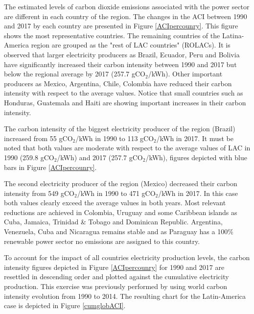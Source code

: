 \documentclass[energies,article,accept,moreauthors,12pt,a4paper]{mdpi} %
\begin{document}
        
          The estimated levels of carbon dioxide emissions associated with the power sector are different in each country of the region. The changes in the ACI between 1990 and 2017 by each country are presented in Figure  \ref{ACIpercounry}.
This figure shows the most representative countries. The remaining countries of the Latina-America region are grouped as the "rest of LAC countries" (ROLACs). It is observed that larger electricity producers as Brazil, Ecuador, Peru and Bolivia have significantly increased their carbon intensity between 1990 and 2017 but below the regional average by 2017 (257.7 gCO$_2$/kWh). Other important producers as Mexico, Argentina, Chile, Colombia have reduced their carbon intensity with respect to the average values. Notice that small countries such as Honduras, Guatemala and Haiti are showing important increases in their carbon intensity.

 The carbon intensity of the biggest electricity producer of the region (Brazil) increased from 55 gCO$_2$/kWh in 1990 to
113 gCO$_2$/kWh in 2017. It must be noted that both values are moderate with respect to the average values of LAC in 1990 (259.8 gCO$_2$/kWh) and 2017 (257.7 gCO$_2$/kWh), figures depicted with blue bars in Figure \ref{ACIpercounry}.  


The second electricity producer of the region  (Mexico) decreased their carbon intensity from 549 gCO$_2$/kWh in 1990 to 471 gCO$_2$/kWh in 2017. In this case both values clearly exceed the average values in both years. Most relevant reductions are achieved in Colombia, Uruguay and some Caribbean islands as Cuba, Jamaica, Trinidad \& Tobago and Dominican Republic. Argentina, Venezuela, Cuba and Nicaragua remains stable and as Paraguay has a 100\% renewable power sector no emissions are assigned to this country.




To account for the impact of all countries electricity production  levels, the carbon intensity figures depicted in Figure \ref{ACIpercounry} for 1990 and 2017 are resettled in descending order and plotted against the cumulative electricity production. This exercise was previously performed by  \cite{ang2016} using world carbon intensity evolution from 1990 to 2014. The resulting chart for the Latin-America case is depicted in Figure \ref{cumglobACI}. 
\end{document}
